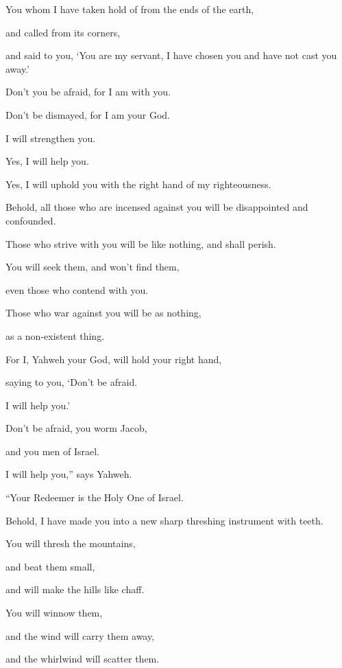 {\par }{\QB {}You whom I have taken hold of from the ends of the earth,
\par }{\QB and called from its corners,
\par }{\QB and said to you, ‘You are my servant, I have chosen you and have not cast you away.’
\par }{\Q {}Don’t you be afraid, for I am with you.
\par }{\QB Don’t be dismayed, for I am your God.
\par }{\QB I will strengthen you.
\par }{\QB Yes, I will help you.
\par }{\QB Yes, I will uphold you with the right hand of my righteousness.
\par }{\Q {}Behold, all those who are incensed against you will be disappointed and confounded.
\par }{\QB Those who strive with you will be like nothing, and shall perish.
\par }{\Q {}You will seek them, and won’t find them,
\par }{\QB even those who contend with you.
\par }{\QB Those who war against you will be as nothing,
\par }{\QB as a non-existent thing.
\par }{\Q {}For I, Yahweh your God, will hold your right hand,
\par }{\QB saying to you, ‘Don’t be afraid.
\par }{\QB I will help you.’
\par }{\Q {}Don’t be afraid, you worm Jacob,
\par }{\QB and you men of Israel.
\par }{\QB I will help you,” says Yahweh.
\par }{\QB “Your Redeemer is the Holy One of Israel.
\par }{\Q {}Behold, I have made you into a new sharp threshing instrument with teeth.
\par }{\QB You will thresh the mountains,
\par }{\QB and beat them small,
\par }{\QB and will make the hills like chaff.
\par }{\Q {}You will winnow them,
\par }{\QB and the wind will carry them away,
\par }{\QB and the whirlwind will scatter them.
}
